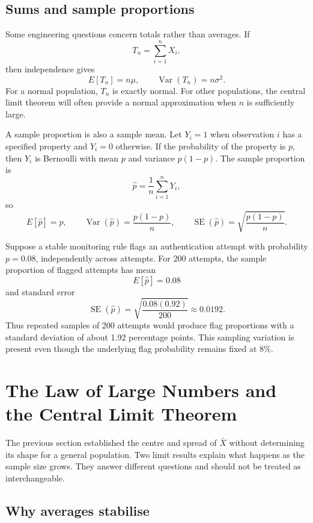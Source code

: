 \subsection{Sums and sample proportions}

Some engineering questions concern totals rather than averages. If
\[
    T_n=\sum_{i=1}^{n}X_i,
\]
then independence gives
\[
    E[T_n]=n\mu,
    \qquad
    \operatorname{Var}(T_n)=n\sigma^2.
\]
For a normal population, $T_n$ is exactly normal. For other populations, the central limit theorem will often provide a normal approximation when $n$ is sufficiently large.

A sample proportion is also a sample mean. Let $Y_i=1$ when observation $i$ has a specified property and $Y_i=0$ otherwise. If the probability of the property is $p$, then $Y_i$ is Bernoulli with mean $p$ and variance $p(1-p)$. The sample proportion is
\[
    \widehat p=\frac{1}{n}\sum_{i=1}^{n}Y_i,
\]
so
\[
    E[\widehat p]=p,
    \qquad
    \operatorname{Var}(\widehat p)=\frac{p(1-p)}{n},
    \qquad
    \operatorname{SE}(\widehat p)=\sqrt{\frac{p(1-p)}{n}}.
\]

\begin{example}\par
Suppose a stable monitoring rule flags an authentication attempt with probability $p=0.08$, independently across attempts. For 200 attempts, the sample proportion of flagged attempts has mean
\[
    E[\widehat p]=0.08
\]
and standard error
\[
    \operatorname{SE}(\widehat p)
      =\sqrt{\frac{0.08(0.92)}{200}}
      \approx0.0192.
\]
Thus repeated samples of 200 attempts would produce flag proportions with a standard deviation of about 1.92 percentage points. This sampling variation is present even though the underlying flag probability remains fixed at 8\%.
\end{example}

\section{The Law of Large Numbers and the Central Limit Theorem}
\label{sec:law-large-numbers-clt}

The previous section established the centre and spread of $\bar X$ without determining its shape for a general population. Two limit results explain what happens as the sample size grows. They answer different questions and should not be treated as interchangeable.

\subsection{Why averages stabilise}

